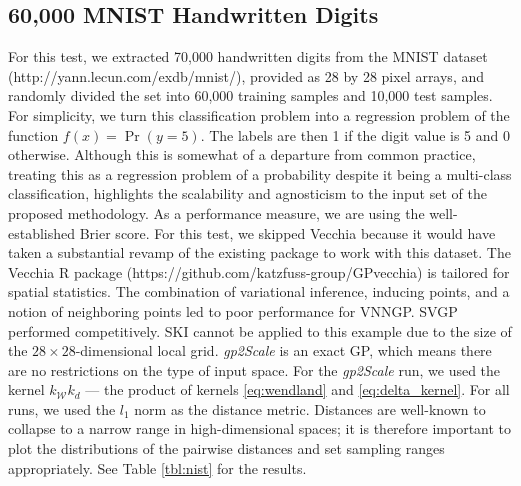 \documentclass{article}
\begin{document}
\subsection{60,000 MNIST Handwritten Digits}
For this test, we extracted 70,000 handwritten digits from the MNIST dataset (http://yann.lecun.com/exdb/mnist/), provided as 28 by 28 pixel arrays, and randomly divided the set into 60,000 training samples and 10,000 test samples. For simplicity, we turn this classification problem into a regression problem of the function $f(x)=\Pr(y=5)$. The labels are then 1 if the digit value is 5 and 0 otherwise. Although this is somewhat of a departure from common practice, treating this as a regression problem of a probability despite it being a multi-class classification, highlights the scalability and agnosticism to the input set of the proposed methodology. As a performance measure, we are using the well-established Brier score. For this test, we skipped Vecchia because it would have taken a substantial revamp of the existing package to work with this dataset. The Vecchia R package (https://github.com/katzfuss-group/GPvecchia) is tailored for spatial statistics. The combination of variational inference, inducing points, and a notion of neighboring points led to poor performance for VNNGP. SVGP performed competitively.
SKI cannot be applied to this example due to the size of the $28 \times 28$-dimensional local grid. \emph{gp2Scale} is an exact GP, which means there are no restrictions on the type of input space. For the \emph{gp2Scale} run, we used the kernel $k_{\mathcal{W}} k_{d}$ --- the product of kernels \eqref{eq:wendland} and \eqref{eq:delta_kernel}. For all runs, we used the $l_1$ norm as the distance metric. Distances are well-known to collapse to a narrow range in high-dimensional spaces; it is therefore important to plot the distributions of the pairwise distances and set sampling ranges appropriately. See Table \ref{tbl:nist} for the results. 
\end{document}
